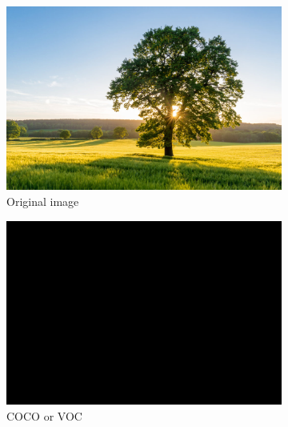 \documentclass[12pt,a4paper,table,dvipsnames,tikz]{report}
\newcommand{\acronym}{\MakeUppercase}
\begin{document}
	
	\begin{figure}[h!]
		\caption{Results given from outdoor input. Fully convolutional network, Pyramid 
		scene parsing network and DeepLab trained on \acronym{coco}, \acronym{pascal voc} 
		and \acronym{ade20k} dataset.}
		\centering
		\begin{subfigure}[b]{0.3\textwidth}
			\includegraphics[width=\textwidth]{out}
			\caption{Original image}
		\end{subfigure}
		\begin{subfigure}[b]{0.3\textwidth}
			\includegraphics[width=\textwidth]{out_coco_voc}
			\caption{\acronym{coco} or \acronym{voc}}
		\end{subfigure}
		\\
		\begin{subfigure}[b]{0.3\textwidth}

\end{subfigure}
\end{figure}
\end{document}
